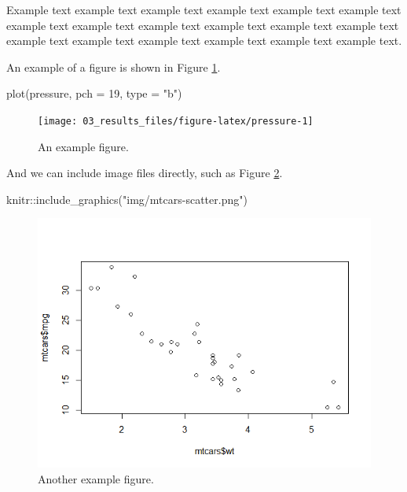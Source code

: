 \documentclass[
  openany]{book}
\newenvironment{Shaded}{\begin{snugshade}}{\end{snugshade}}
\newcommand{\AttributeTok}[1]{\textcolor[rgb]{0.77,0.63,0.00}{#1}}
\newcommand{\DecValTok}[1]{\textcolor[rgb]{0.00,0.00,0.81}{#1}}
\newcommand{\FunctionTok}[1]{\textcolor[rgb]{0.00,0.00,0.00}{#1}}
\newcommand{\NormalTok}[1]{#1}
\newcommand{\SpecialCharTok}[1]{\textcolor[rgb]{0.00,0.00,0.00}{#1}}
\newcommand{\StringTok}[1]{\textcolor[rgb]{0.31,0.60,0.02}{#1}}
\begin{document}
Example text example text example text example text example text example text example text example text example text example text example text example text example text example text example text example text example text example text.

An example of a figure is shown in Figure \ref{fig:pressure}.

\begin{Shaded}
\begin{Highlighting}[]
\FunctionTok{plot}\NormalTok{(pressure, }\AttributeTok{pch =} \DecValTok{19}\NormalTok{, }\AttributeTok{type =} \StringTok{"b"}\NormalTok{)}
\end{Highlighting}
\end{Shaded}

\begin{figure}[H]

{\centering \texttt{[image: 03\_results\_files/figure-latex/pressure-1]} 

}

\caption{An example figure.}\label{fig:pressure}
\end{figure}

And we can include image files directly, such as Figure \ref{fig:knitlogo}.

\begin{Shaded}
\begin{Highlighting}[]
\NormalTok{knitr}\SpecialCharTok{::}\FunctionTok{include\_graphics}\NormalTok{(}\StringTok{"img/mtcars{-}scatter.png"}\NormalTok{)}
\end{Highlighting}
\end{Shaded}

\begin{figure}

{\centering \includegraphics[width=0.75\linewidth]{img/mtcars-scatter} 

}

\caption{Another example figure.}\label{fig:knitlogo}
\end{figure}
\end{document}
